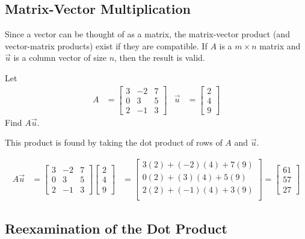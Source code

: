 \subsection{Matrix-Vector Multiplication} 

Since a vector can be thought of as a matrix, the matrix-vector product (and vector-matrix products) exist if they are compatible.  If $A$ is a $m \times n$ matrix and $\vec{u}$ is a column vector of size $n$, then the result is valid.  


\begin{example}
Let
%
\begin{align*}
A & = \begin{bmatrix}
3 & -2 & 7 \\
0 & 3 & 5 \\
2 & -1 & 3 
\end{bmatrix} & \vec{u} & = \begin{bmatrix}
2 \\ 4 \\ 9 
\end{bmatrix}
\end{align*}
Find $A\vec{u}$.

\solution

This product is found by taking the dot product of rows of $A$ and $\vec{u}$.  

\begin{align*}
A \vec{u} & = \begin{bmatrix}
3 & -2 & 7 \\
0 & 3 & 5 \\
2 & -1 & 3 
\end{bmatrix}\begin{bmatrix}
2 \\ 4 \\ 9
\end{bmatrix}
 & = \begin{bmatrix}
3 (2) + (-2)(4) + 7 (9) \\
0 (2) + (3)(4) + 5 (9) \\
2 (2) + (-1)(4) + 3 (9) \\
\end{bmatrix} = \begin{bmatrix}
61 \\
57 \\
27 
\end{bmatrix}
\end{align*}
\end{example}


\subsection{Reexamination of the Dot Product}  

